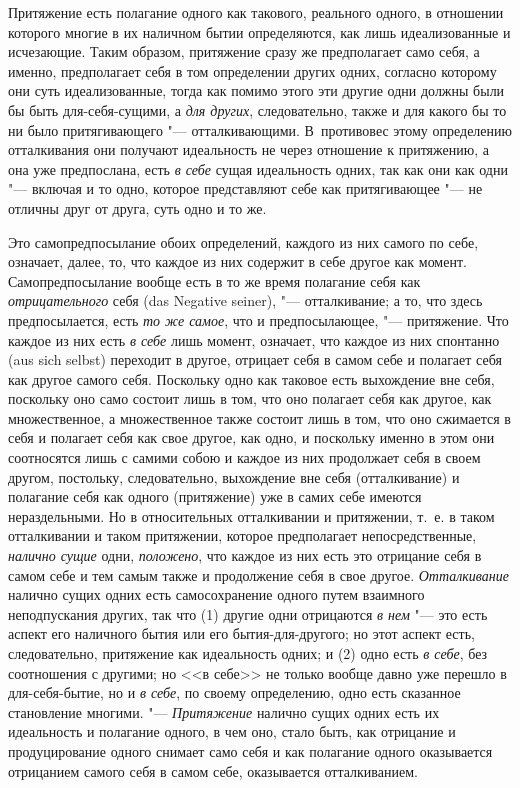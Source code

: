 Притяжение есть полагание одного как такового, реального одного, в отношении
которого многие в их наличном бытии определяются, как лишь идеализованные и
исчезающие. Таким образом, притяжение сразу же предполагает само себя, а
именно, предполагает себя в том определении других одних, согласно которому
они суть идеализованные, тогда как помимо этого эти другие одни должны были
бы быть для-себя-сущими, а {\em для других},
следовательно, также и для какого бы то ни было притягивающего
"--- отталкивающими. В~противовес этому определению отталкивания они получают
идеальность не через отношение к притяжению, а она уже предпослана, есть
{\em в себе} сущая идеальность одних, так как они как одни "--- включая
и то одно, которое представляют себе как притягивающее "--- не
отличны друг от друга, суть одно и то же.

Это самопредпосылание обоих определений, каждого из них самого по себе,
означает, далее, то, что каждое из них содержит в себе другое как момент.
Самопредпосылание вообще есть в то же время полагание себя как
{\em отрицательного} себя (das Negative seiner), "---
отталкивание; а то, что здесь предпосылается, есть
{\em то же самое}, что и предпосылающее, "--- притяжение.
Что каждое из них есть {\em в себе} лишь момент,
означает, что каждое из них спонтанно (aus sich selbst) переходит в
другое, отрицает себя в самом себе и полагает себя как другое самого себя.
Поскольку одно как таковое есть выхождение вне себя, поскольку оно само
состоит лишь в том, что оно полагает себя как другое, как множественное, а
множественное также состоит лишь в том, что оно сжимается в себя и полагает
себя как свое другое, как одно, и поскольку именно в этом они соотносятся
лишь с самими собою и каждое из них продолжает себя в своем другом,
постольку, следовательно, выхождение вне себя (отталкивание) и полагание
себя как одного (притяжение) уже в самих себе имеются нераздельными. Но в
относительных отталкивании и притяжении, т.~е. в таком отталкивании и таком
притяжении, которое предполагает непосредственные, {\em налично сущие} одни,
{\em положено}, что каждое из них есть это отрицание
себя в самом себе и тем самым также и продолжение себя в свое другое.
{\em Отталкивание} налично сущих одних есть
самосохранение одного путем взаимного неподпускания других, так что (1)
другие одни отрицаются {\em в нем} "--- это есть аспект
его наличного бытия или его бытия-для-другого; но этот аспект есть,
следовательно, притяжение как идеальность одних; и (2) одно есть
{\em в себе}, без соотношения с другими; но <<в себе>> не
только вообще давно уже перешло в для-себя-бытие, но и
{\em в себе}, по своему определению, одно есть
сказанное становление многими. "--- {\em Притяжение}
налично сущих одних есть их идеальность и полагание одного, в чем оно,
стало быть, как отрицание и продуцирование одного снимает само себя и как
полагание одного оказывается отрицанием самого себя в самом себе,
оказывается отталкиванием.


